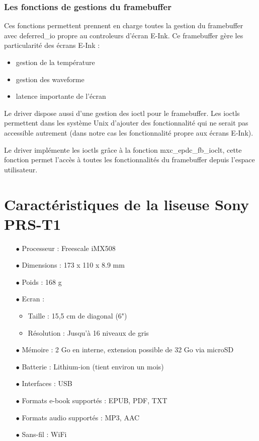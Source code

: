 \subsubsection{Les fonctions de gestions du framebuffer}

Ces fonctions permettent prennent en charge toutes la gestion du framebuffer avec deferred\_io 
propre au controleurs d'écran E-Ink.
Ce framebuffer gère les particularité des écrans E-Ink : 
	\begin{itemize}
		\item gestion de la température
		\item gestion des waveforme
		\item latence importante de l'écran
	\end{itemize}

Le driver dispose aussi d'une gestion des ioctl pour le framebuffer.
Les ioctls permettent dans les système Unix d'ajouter des fonctionnalité qui ne serait pas accessible autrement (dans notre cas les fonctionnalité propre aux écrans E-Ink).

Le driver implémente les ioctls grâce à la fonction mxc\_epdc\_fb\_ioclt, cette fonction permet l'accès à toutes les fonctionnalités du framebuffer depuis l'espace utilisateur.


\section{Caractéristiques de la liseuse Sony PRS-T1}

\begin{itemize}
		\item[$\bullet$] Processeur : Freescale iMX508
		\item[$\bullet$] Dimensions : 173 x 110 x 8.9 mm
		\item[$\bullet$] Poids : 168 g
		\item[$\bullet$] Ecran :
			\begin{itemize}
				\item Taille : 15,5 cm de diagonal (6")
				\item Résolution : Jusqu'à 16 niveaux de gris
			\end{itemize}
		\item[$\bullet$] Mémoire : 2 Go en interne, extension possible de 32 Go via microSD
		\item[$\bullet$] Batterie : Lithium-ion (tient environ un mois)
		\item[$\bullet$] Interfaces : USB
		\item[$\bullet$] Formats e-book supportés : EPUB, PDF, TXT
		\item[$\bullet$] Formats audio supportés : MP3, AAC
		\item[$\bullet$] Sans-fil : WiFi
		
\end{itemize}